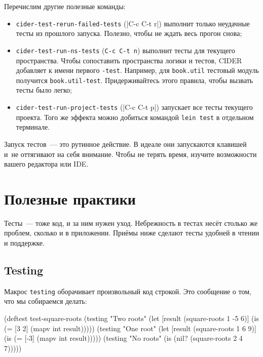 Перечислим другие полезные команды:

\begin{itemize}

\item
  \verb|cider-test-rerun-failed-tests| (\spverb|C-c C-t r|) выполнит только
  неудачные тесты из прошлого запуска. Полезно, чтобы не ждать весь прогон
  снова;

\item
  \verb|cider-test-run-ns-tests| (\verb|C-c C-t n|) выполнит тесты для текущего
  пространства. Чтобы сопоставить пространства логики и тестов, CIDER добавляет
  к имени первого \verb|-test|. Например, для \verb|book.util| тестовый модуль
  получится \verb|book.util-test|. Придерживайтесь этого правила, чтобы вызвать
  тесты было легко;

\item
  \verb|cider-test-run-project-tests| (\spverb|C-c C-t p|) запускает все тесты
  текущего проекта. Того же эффекта можно добиться командой \verb|lein test| в
  отдельном терминале.

\end{itemize}

Запуск тестов~--- это рутинное действие. В идеале они запускаются клавишей и~не
оттягивают на себя внимание. Чтобы не терять время, изучите возможности вашего
редактора или IDE.

\section{Полезные практики}

Тесты~--- тоже код, и за ним нужен уход. Небрежность в тестах несёт столько же
проблем, сколько и в приложении. Приёмы ниже сделают тесты удобней в чтении и
поддержке.

\subsection{Testing}


Макрос \verb|testing| оборачивает произвольный код строкой. Это сообщение о том,
что мы собираемся делать:

\begin{english}
  \begin{clojure}
(deftest test-square-roots
  (testing "Two roots"
    (let [result (square-roots 1 -5 6)]
      (is (= [3 2] (mapv int result)))))
  (testing "One root"
    (let [result (square-roots 1 6 9)]
      (is (= [-3] (mapv int result)))))
  (testing "No roots"
    (is (nil? (square-roots 2 4 7)))))
  \end{clojure}
\end{english}

